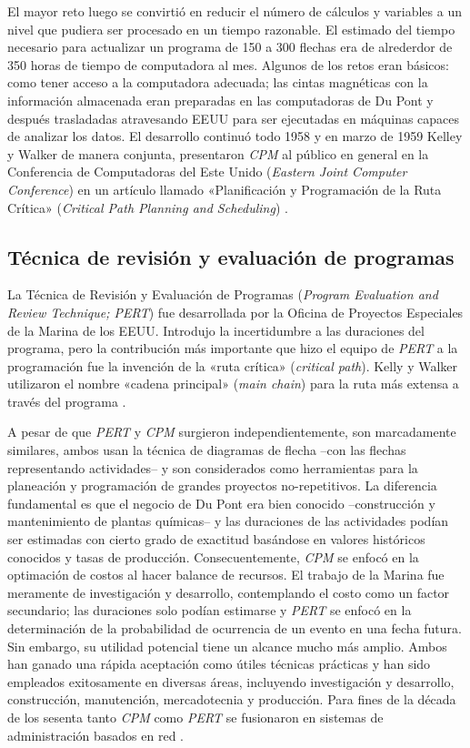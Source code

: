 \documentclass[spanish,draft,12pt,headsepline,footsepline,paper=letter]{scrreprt}
\begin{document}
El mayor reto luego se convirtió en reducir el número de cálculos y variables a un nivel que pudiera ser procesado en un tiempo razonable. El estimado del tiempo necesario para actualizar un programa de 150 a 300 flechas era de alrederdor de 350 horas de tiempo de computadora al mes. Algunos de los retos eran básicos: como tener acceso a la computadora adecuada; las cintas magnéticas con la información almacenada eran preparadas en las computadoras de Du Pont y después trasladadas atravesando EEUU para ser ejecutadas en máquinas capaces de analizar los datos. El desarrollo continuó todo 1958 y en marzo de 1959 Kelley y Walker de manera conjunta, presentaron \textit{CPM} al público en general en la Conferencia de Computadoras del Este Unido (\textit{Eastern Joint Computer Conference}) en un artículo llamado «Planificación y Programación de la Ruta Crítica» (\textit{Critical Path Planning and Scheduling}) \citep[p.~6]{Weaver2006}.


\subsection{Técnica de revisión y evaluación de programas} %
\label{sub:pert}

La Técnica de Revisión y Evaluación de Programas (\textit{Program Evaluation and Review Technique; PERT}) fue desarrollada por la Oficina de Proyectos Especiales de la Marina de los EEUU. Introdujo la incertidumbre a las duraciones del programa, pero la contribución más importante que hizo el equipo de \textit{PERT} a la programación fue la invención de la «ruta crítica» (\textit{critical path}). Kelly y Walker utilizaron el nombre «cadena principal» (\textit{main chain}) para la ruta más extensa a través del programa \citep[p.~7]{Weaver2006}.

A pesar de que \textit{PERT} y \textit{CPM} surgieron independientemente, son marcadamente similares, ambos usan la técnica de diagramas de flecha –con las flechas representando actividades– y son considerados como herramientas para la planeación y programación de grandes proyectos no-repetitivos. La diferencia fundamental es que el negocio de Du Pont era bien conocido –construcción y mantenimiento de plantas químicas– y las duraciones de las actividades podían ser estimadas con cierto grado de exactitud basándose en valores históricos conocidos y tasas de producción. Consecuentemente, \textit{CPM} se enfocó en la optimación de costos al hacer balance de recursos. El trabajo de la Marina fue meramente de investigación y desarrollo, contemplando el costo como un factor secundario; las duraciones solo podían estimarse y \textit{PERT} se enfocó en la determinación de la probabilidad de ocurrencia de un evento en una fecha futura. Sin embargo, su utilidad potencial tiene un alcance mucho más amplio. Ambos han ganado una rápida aceptación como útiles técnicas prácticas y han sido empleados exitosamente en diversas áreas, incluyendo investigación y desarrollo, construcción, manutención, mercadotecnia y producción. Para fines de la década de los sesenta tanto \textit{CPM} como \textit{PERT} se fusionaron en sistemas de administración basados en red \citep[p.~372,~8]{Baker2009,Weaver2006}.
\end{document}

